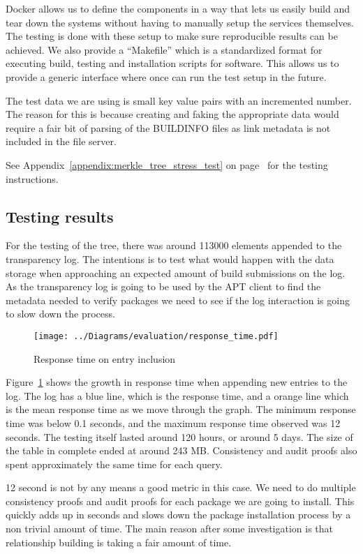 \documentclass[../Main/thesis.tex]{subfiles}
\begin{document}
Docker allows us to define the components in a way that lets us easily build and
tear down the systems without having to manually setup the services themselves.
The testing is done with these setup to make sure reproducible results can be
achieved. We also provide a ``Makefile'' which is a standardized format for
executing build, testing and installation scripts for software. This allows us
to provide a generic interface where once can run the test setup in the future.

The test data we are using is small key value pairs with an incremented number.
The reason for this is because creating and faking the appropriate data would
require a fair bit of parsing of the BUILDINFO files as link metadata is not
included in the file server.

See Appendix~\ref{appendix:merkle_tree_stress_test} on
page~\pageref{appendix:merkle_tree_stress_test} for the testing instructions.

\subsection*{Testing results}%
\label{sub:testing_results}
For the testing of the tree, there was around 113000 elements appended to the
transparency log. The intentions is to test what would happen with the data
storage when approaching an expected amount of build submissions on the log.
As the transparency log is going to be used by the APT client to find the
metadata needed to verify packages we need to see if the log interaction is
going to slow down the process.


\begin{figure}[H]
\centering
\texttt{[image: ../Diagrams/evaluation/response\_time.pdf]}
\caption{Response time on entry inclusion}
\label{fig:response_time}
\end{figure}

Figure~\ref{fig:response_time} shows the growth in response time when appending
new entries to the log. The log has a blue line, which is the response time, and
a orange line which is the mean response time as we move through the graph. The
minimum response time was below 0.1 seconds, and the maximum response time
observed was 12 seconds. The testing itself lasted around 120 hours, or around 5
days. The size of the table in complete ended at around 243 MB. Consistency and
audit proofs also spent approximately the same time for each query.

12 second is not by any means a good metric in this case. We need to do multiple
consistency proofs and audit proofs for each package we are going to install.
This quickly adds up in seconds and slows down the package installation process
by a non trivial amount of time. The main reason after some investigation is
that relationship building is taking a fair amount of time.
\end{document}
